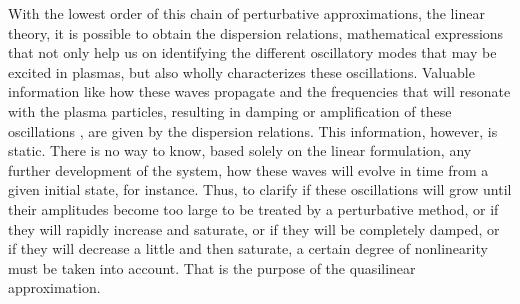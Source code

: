 \documentclass[12pt,a4paper,ruledheader]{report}
\begin{document}
With the lowest order of this chain of perturbative approximations,
the linear theory, it is possible to obtain the dispersion relations,
mathematical expressions that not only help us on identifying the
different oscillatory modes that may be excited in plasmas, but also
wholly characterizes these oscillations. 
Valuable information like
how these waves propagate and the frequencies that will resonate with
the plasma particles, resulting in damping or amplification of these
oscillations \cite{bitt,chen,gurnett2017}, are given by the dispersion
relations. This information, however, is static. 
There is no way to
know, based solely on the linear formulation, any further development
of the system, how these waves will evolve in time from a given initial
state, for instance. Thus, to clarify if these oscillations will grow
until their amplitudes become too large to be treated by a perturbative
method, or if they will rapidly increase and saturate, or if they will
be completely damped, or if they will decrease a little and then saturate, 
a certain degree of nonlinearity must be taken into account. That is the
purpose of the quasilinear approximation.
\end{document}
